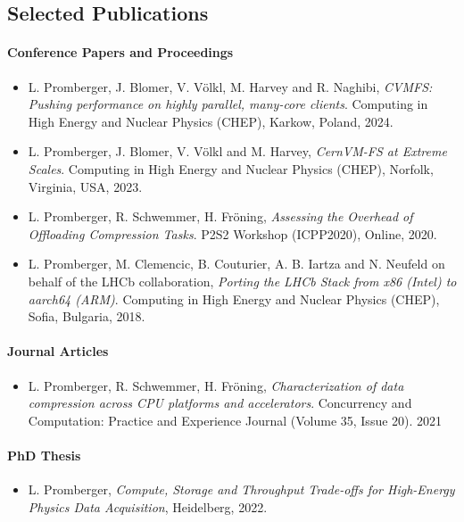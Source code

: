 \subsection*{Selected Publications}

\paragraph{Conference Papers and Proceedings}

\begin{itemize}
    \item[] L. Promberger, J. Blomer, V. Völkl, M. Harvey and R. Naghibi, \emph{CVMFS: Pushing performance on highly parallel, many-core clients}. Computing in High Energy and Nuclear Physics (CHEP), Karkow, Poland, 2024.

    \item[] L. Promberger, J. Blomer, V. Völkl and M. Harvey, \emph{CernVM-FS at Extreme Scales}. Computing in High Energy and Nuclear Physics (CHEP), Norfolk, Virginia, USA, 2023.

    \item[] L. Promberger, R. Schwemmer, H. Fröning, \emph{Assessing the Overhead of Offloading Compression Tasks}. P2S2 Workshop (ICPP2020), Online, 2020.

    \item[] L. Promberger, M. Clemencic, B. Couturier, A. B. Iartza and N. Neufeld on behalf of the LHCb collaboration, \emph{Porting the LHCb Stack from x86 (Intel) to aarch64 (ARM)}. Computing in High Energy and Nuclear Physics (CHEP), Sofia, Bulgaria, 2018.
\end{itemize}

\paragraph{Journal Articles}

\begin{itemize}
    \item[] L. Promberger, R. Schwemmer, H. Fröning,
    \emph{Characterization of data compression across CPU platforms and accelerators}.
    Concurrency and Computation: Practice and Experience Journal (Volume 35, Issue 20). 2021
\end{itemize}

\paragraph{PhD Thesis}

\begin{itemize}
    \item[] L. Promberger, \emph{Compute, Storage and Throughput Trade-offs for High-Energy Physics Data Acquisition}, Heidelberg, 2022.
\end{itemize}